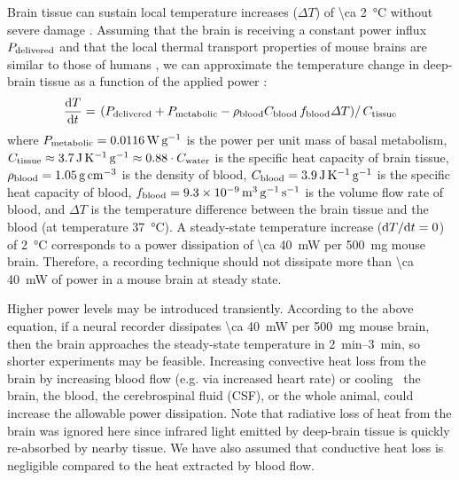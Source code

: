 Brain tissue can sustain local temperature increases ($\Delta T$) of \SI{\ca 2}{\celsius} without severe damage \cite{azevedo09}.
Assuming that the brain is receiving a constant power influx $P_{\text{\scriptsize delivered}}$ and that the local thermal transport properties of mouse brains are similar to those of humans \cite{allen02}, we can approximate the temperature change in deep-brain tissue as a function of the applied power \cite{sotero11}:
\[\frac{\text{d} T}{\text{d} t} = \left.\left(P_{\text{\scriptsize delivered}} + P_{\text{\scriptsize metabolic}} - \rho_{\text{\scriptsize blood}} C_{\text{\scriptsize blood}}\,f_{\text{\scriptsize blood}} \Delta T\right)\right/C_{\text{\scriptsize tissue}}\]
where $P_{\text{\scriptsize metabolic}} = \SI{0.0116}{\watt\per\gram}$ is the power per unit mass of basal metabolism, $C_{\text{\scriptsize tissue}} \approx \SI{3.7}{\joule\per\kelvin\per\gram} \approx 0.88\cdot C_{\text{\scriptsize water}}$ is the specific heat capacity of brain tissue, $\rho_{\text{\scriptsize blood}}=\SI{1.05}{\gram\per\centi\meter\cubed}$ is the density of blood, $C_{\text{\scriptsize blood}} = \SI{3.9}{\joule\per\kelvin\per\gram}$ is the specific heat capacity of blood, $f_{\text{\scriptsize blood}} = \SI{9.3e-9}{\meter\cubed\per\gram\per\second}$ is the volume flow rate of blood, and $\Delta T$ is the temperature difference between the brain tissue and the blood (at temperature \SI{37}{\celsius}).
A steady-state temperature increase ($\text{d} T/\text{d} t = 0$) of \SI{2}{\celsius} corresponds to a power dissipation of \SI{\ca 40}{\milli\watt} per \SI{500}{\milli\gram} mouse brain.
Therefore, a recording technique should not dissipate more than \SI{\ca 40}{\milli\watt} of power in a mouse brain at steady state.

Higher power levels may be introduced transiently.
According to the above equation, if a neural recorder dissipates \SI{\ca 40}{\milli\watt} per \SI{500}{\milli\gram} mouse brain, then the brain approaches the steady-state temperature in \SIrange{2}{3}{\minute}, so shorter experiments may be feasible.
Increasing convective heat loss from the brain by increasing blood flow (e.g. via increased heart rate) or cooling~\cite{polderman2004} the brain, the blood, the cerebrospinal fluid (CSF), or the whole animal, could increase the allowable power dissipation.
Note that radiative loss of heat from the brain was ignored here since infrared light emitted by deep-brain tissue is quickly re-absorbed by nearby tissue.
We have also assumed that conductive heat loss is negligible compared to the heat extracted by blood flow.

